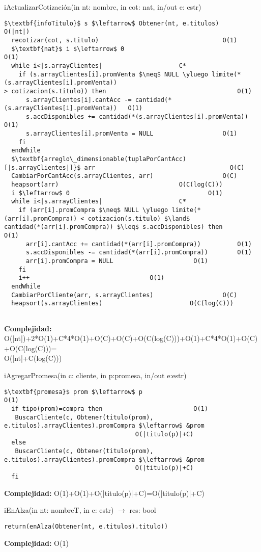 iActualizarCotizaci\'on(in nt: nombre, in cot: nat, in/out e: estr)
\begin{lstlisting}[mathescape]
  $\textbf{infoTitulo}$ s $\leftarrow$ Obtener(nt, e.titulos) 		O(|nt|)
  recotizar(cot, s.titulo)									O(1)
  $\textbf{nat}$ i $\leftarrow$ 0										O(1)
  while i<|s.arrayClientes|						C*
    if (s.arrayClientes[i].promVenta $\neq$ NULL \yluego limite(*(s.arrayClientes[i].promVenta))
> cotizacion(s.titulo)) then									O(1)
      s.arrayClientes[i].cantAcc -= cantidad(*(s.arrayClientes[i].promVenta))	O(1)
      s.accDisponibles += cantidad(*(s.arrayClientes[i].promVenta))		O(1)
      s.arrayClientes[i].promVenta = NULL					O(1)
    fi
  endWhile
  $\textbf{arreglo\_dimensionable(tuplaPorCantAcc)[|s.arrayClientes|]}$ arr										O(C)
  CambiarPorCantAcc(s.arrayClientes, arr)					O(C)
  heapsort(arr)								    O(C(log(C)))
  i $\leftarrow$ 0										O(1)
  while i<|s.arrayClientes|						C*
    if (arr[i].promCompra $\neq$ NULL \yluego limite(*(arr[i].promCompra)) < cotizacion(s.titulo) $\land$ 
cantidad(*(arr[i].promCompra)) $\leq$ s.accDisponibles) then			O(1)
      arr[i].cantAcc += cantidad(*(arr[i].promCompra))			O(1)
      s.accDisponibles -= cantidad(*(arr[i].promCompra))		O(1)
      arr[i].promCompra = NULL						O(1)
    fi
    i++									O(1)
  endWhile
  CambiarPorCliente(arr, s.arrayClientes)					O(C)
  heapsort(s.arrayClientes)						   O(C(log(C)))
  
\end{lstlisting}
\textbf{Complejidad:} O(|nt|)+2*O(1)+C*4*O(1)+O(C)+O(C)+O(C(log(C)))+O(1)+C*4*O(1)+O(C)+O(C(log(C)))=\\\indent\indent\indent O(|nt|+C(log(C)))

iAgregarPromesa(in c: cliente, in p:promesa, in/out e:estr)
\begin{lstlisting}[mathescape]
  $\textbf{promesa}$ prom $\leftarrow$ p									O(1)
  if tipo(prom)=compra then							O(1)
   BuscarCliente(c, Obtener(titulo(prom), e.titulos).arrayClientes).promCompra $\leftarrow$ &prom
   									O(|titulo(p)|+C)
  else
   BuscarCliente(c, Obtener(titulo(prom), e.titulos).arrayClientes).promCompra $\leftarrow$ &prom
   									O(|titulo(p)|+C)
  fi
\end{lstlisting}
\textbf{Complejidad:} O(1)+O(1)+O(|titulo(p)|+C)=O(|titulo(p)|+C)

iEnAlza(in nt: nombreT, in e: estr) $\rightarrow$ res: bool
\begin{lstlisting}[mathescape]
  return(enAlza(Obtener(nt, e.titulos).titulo))
\end{lstlisting}
\textbf{Complejidad:} O(1)



